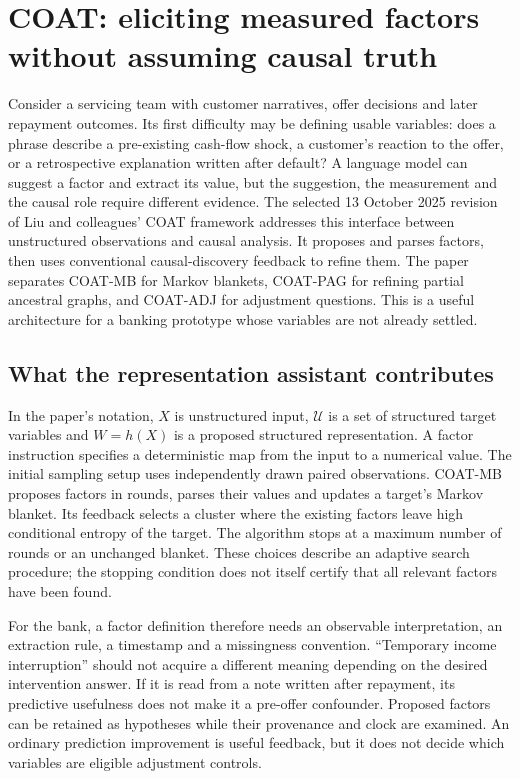 \section{COAT: eliciting measured factors without assuming causal truth}
\label{exec19:coat-scope}

Consider a servicing team with customer narratives, offer decisions and later
repayment outcomes. Its first difficulty may be defining usable variables:
does a phrase describe a pre-existing cash-flow shock, a customer's reaction to
the offer, or a retrospective explanation written after default? A language
model can suggest a factor and extract its value, but the suggestion, the
measurement and the causal role require different evidence. The selected
13 October 2025 revision of Liu and colleagues' COAT framework addresses this
interface between unstructured observations and causal analysis. It proposes
and parses factors, then uses conventional causal-discovery feedback to refine
them. The paper separates COAT-MB for Markov blankets, COAT-PAG for refining
partial ancestral graphs, and COAT-ADJ for adjustment questions. This is a
useful architecture for a banking prototype whose variables are not already
settled.\citep{exec19_coat}

\subsection{What the representation assistant contributes}
\label{exec19:coat-representation}
In the paper's notation, $X$ is unstructured input, $\mathcal U$ is a set of
structured target variables and $W=h(X)$ is a proposed structured
representation. A factor instruction specifies a deterministic map from the
input to a numerical value. The initial sampling setup uses independently
drawn paired observations. COAT-MB proposes factors in rounds, parses their
values and updates a target's Markov blanket. Its feedback selects a cluster
where the existing factors leave high conditional entropy of the target. The
algorithm stops at a maximum number of rounds or an unchanged blanket.
These choices describe an adaptive search procedure; the stopping condition
does not itself certify that all relevant factors have been found.
\citep{exec19_coat}

For the bank, a factor definition therefore needs an observable interpretation,
an extraction rule, a timestamp and a missingness convention. ``Temporary
income interruption'' should not acquire a different meaning depending on the
desired intervention answer. If it is read from a note written after repayment,
its predictive usefulness does not make it a pre-offer confounder. Proposed
factors can be retained as hypotheses while their provenance and clock are
examined. An ordinary prediction improvement is useful feedback, but it does
not decide which variables are eligible adjustment controls.

